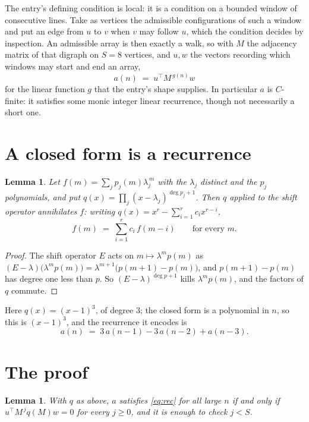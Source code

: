 \documentclass[11pt,a4paper]{article}
\theoremstyle{plain}
\newtheorem{lemma}[theorem]{Lemma}
\theoremstyle{definition}
\begin{document}
The entry's defining condition is local: it is a condition on a bounded window of consecutive lines. Take as vertices the
admissible configurations of such a window and put an edge from $u$ to $v$ when $v$ may
follow $u$, which the condition decides by inspection. An admissible array is then exactly a
walk, so with $M$ the adjacency matrix of that digraph on $S=8$ vertices, and $u,w$ the
vectors recording which windows may start and end an array,
\[
a(n)\;=\;u^{\!\top}M^{\,g(n)}w
\]
for the linear function $g$ that the entry's shape supplies. In particular $a$ is
$C$-finite: it satisfies some monic integer linear recurrence, though not necessarily a short
one.

\section{A closed form is a recurrence}

\begin{lemma}\label{lem:ann}
Let $f(m)=\sum_{j}p_j(m)\lambda_j^{\,m}$ with the $\lambda_j$ distinct and the $p_j$
polynomials, and put $q(x)=\prod_j(x-\lambda_j)^{\deg p_j+1}$. Then $q$ applied to the shift
operator annihilates $f$: writing $q(x)=x^{r}-\sum_{i=1}^{r}c_ix^{r-i}$,
\[
f(m)\;=\;\sum_{i=1}^{r}c_i\,f(m-i)\qquad\text{for every }m.
\]
\end{lemma}

\begin{proof}
The shift operator $E$ acts on $m\mapsto\lambda^{m}p(m)$ as
$(E-\lambda)\bigl(\lambda^{m}p(m)\bigr)=\lambda^{m+1}\bigl(p(m+1)-p(m)\bigr)$, and
$p(m+1)-p(m)$ has degree one less than $p$. So $(E-\lambda)^{\deg p+1}$ kills
$\lambda^{m}p(m)$, and the factors of $q$ commute.
\end{proof}

Here $q(x)=(x-1)^{3}$, of degree $3$; the closed form is a polynomial in $n$, so this is $(x-1)^{3}$, and the recurrence it encodes is
\begin{equation}\label{eq:rec}
a(n)\;=\;3\,a(n-1) - 3\,a(n-2) + a(n-3).
\end{equation}

\section{The proof}

\begin{lemma}\label{lem:crit}
With $q$ as above, $a$ satisfies \eqref{eq:rec} for all large $n$ if and only if
$u^{\!\top}M^{\,j}q(M)w=0$ for every $j\ge0$, and it is enough to check $j<S$.
\end{lemma}
\end{document}
